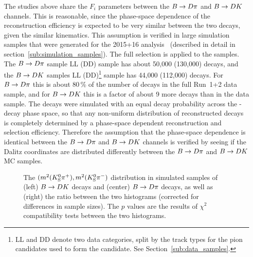 The studies above share the $F_i$ parameters between the ${B}\rightarrow{\ensuremath{D}}\pi$ and ${B}\rightarrow{\ensuremath{D}}{\ensuremath{K}}$ channels. This is reasonable, since the phase-space dependence of the reconstruction efficiency is expected to be very similar between the two decays, given the similar kinematics. This assumption is verified in large simulation samples that were generated for the 2015+16 analysis~\cite{LHCb-PAPER-2018-017} (described in detail in section~\ref{sub:simulation_samples}). The full selection is applied to the samples. The ${B}\rightarrow{\ensuremath{D}}\pi$ sample LL (DD) sample has about 50,000 (130,000) decays, and the ${B}\rightarrow{\ensuremath{D}}{\ensuremath{K}}$ samples LL (DD)\footnote{LL and DD denote two data categories, split by the track types for the pion candidates used to form the \KS candidate. See Section~\ref{sub:data_samples}.} sample has 44,000 (112,000) decays. For ${B}\rightarrow{\ensuremath{D}}\pi$ this is about 80\,\% of the number of decays in the full Run~1+2 data sample, and for ${B}\rightarrow{\ensuremath{D}}{\ensuremath{K}}$ this is a factor of about 9 more decays than in the data sample. The decays were simulated with an equal decay probability across the \D-decay phase space, so that any non-uniform distribution of reconstructed decays is completely determined by a phase-space dependent reconstruction and selection efficiency. Therefore the assumption that the phase-space dependence is identical between the ${B}\rightarrow{\ensuremath{D}}\pi$ and ${B}\rightarrow{\ensuremath{D}}{\ensuremath{K}}$ channels is verified by seeing if the Dalitz coordinates are distributed differently between the ${B}\rightarrow{\ensuremath{D}}\pi$ and ${B}\rightarrow{\ensuremath{D}}{\ensuremath{K}}$ MC samples.

\begin{figure}[tbp]
    \centering
    \caption{The $(m^2({{K}^0_{\mathrm{S}}}{{\pi}^+}), m^2({{K}^0_{\mathrm{S}}}{{\pi}^-})$ distribution in simulated samples of (left)  ${B}\rightarrow{\ensuremath{D}}{\ensuremath{K}}$ decays and (center)  ${B}\rightarrow{\ensuremath{D}}\pi$ decays, as well as (right) the ratio between the two histograms (corrected for differences in sample sizes). The $p$ values are the results of $\chi^2$ compatibility tests between the two histograms.}
    \label{fig:dk_vs_dpi_chi2}
\end{figure}

